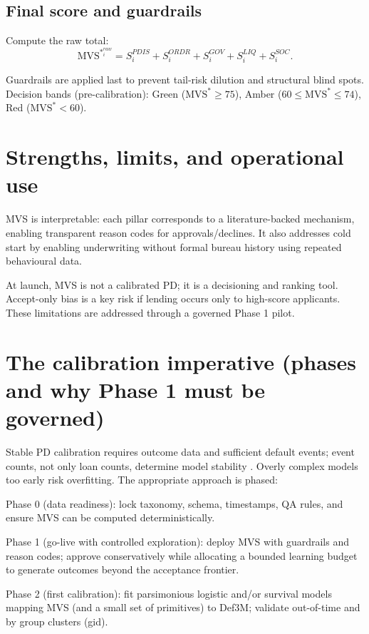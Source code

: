 \documentclass[11t]{article}
\newcommand{\MVS}{\mathrm{MVS}^{\ast}}
\begin{document}
\subsection{Final score and guardrails}

Compute the raw total:
\begin{equation}
\MVS^{raw}_i = S^{PDIS}_i + S^{ORDR}_i + S^{GOV}_i + S^{LIQ}_i + S^{SOC}_i.
\end{equation}

Guardrails are applied last to prevent tail-risk dilution and structural blind spots. Decision bands (pre-calibration): Green ($\MVS \ge 75$), Amber ($60 \le \MVS \le 74$), Red ($\MVS < 60$).

\section{Strengths, limits, and operational use}

MVS is interpretable: each pillar corresponds to a literature-backed mechanism, enabling transparent reason codes for approvals/declines. It also addresses cold start by enabling underwriting without formal bureau history using repeated behavioural data.

At launch, MVS is not a calibrated PD; it is a decisioning and ranking tool. Accept-only bias is a key risk if lending occurs only to high-score applicants. These limitations are addressed through a governed Phase 1 pilot.

\section{The calibration imperative (phases and why Phase 1 must be governed)}

Stable PD calibration requires outcome data and sufficient default events; event counts, not only loan counts, determine model stability \citet{RileyEtAl2020,VittinghoffMcCulloch2006}. Overly complex models too early risk overfitting. The appropriate approach is phased:

Phase 0 (data readiness): lock taxonomy, schema, timestamps, QA rules, and ensure MVS can be computed deterministically.

Phase 1 (go-live with controlled exploration): deploy MVS with guardrails and reason codes; approve conservatively while allocating a bounded learning budget to generate outcomes beyond the acceptance frontier.

Phase 2 (first calibration): fit parsimonious logistic and/or survival models mapping MVS (and a small set of primitives) to Def3M; validate out-of-time and by group clusters (gid).
\end{document}
